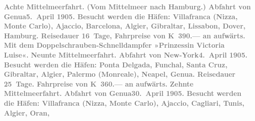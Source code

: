 \begin{ledgroupsized}[t]{13cm}
           \pstart
           \textcolor{gray}{\textbf{\textbf{Achte Mittelmeerfahrt.}
                  (Vom Mittelmeer nach Hamburg.) Abfahrt von Genua\textbf{5. April 1905}. Besucht werden die Häfen: Villafranca
                     (Nizza, Monte
                     Carlo), Ajaccio, Barcelona, Algier, Gibraltar, Lissabon, Dover, Hamburg. Reisedauer 16 Tage, Fahrpreise von \textbf{K 390.—} an aufwärts.}}\pend
           {\bigskip}\pstart
           \noindent{}\centering{}\textcolor{gray}{\textbf{Mit dem Doppelschrauben-Schnelldampfer »Prinzessin Victoria
                  Luise«.}}\pend
           \pstart
           \noindent{}\textcolor{gray}{\textbf{\textbf{Neunte Mittelmeerfahrt.}
                  Abfahrt von New-York\textbf{4. April 1905}. Besucht werden die Häfen: Ponta Delgada,
                     Funchal, Santa
                     Cruz, Gibraltar, Algier, Palermo (Monreale), Neapel, Genua. Reisedauer 25 Tage.
                  Fahrpreise von \textbf{K 360.—} an aufwärts.}}\pend
           \pstart
           \textcolor{gray}{\textbf{\textbf{Zehnte Mittelmeerfahrt.}
                  Abfahrt von Genua\textbf{30. April 1905}. Besucht werden die Häfen: Villafranca
                     (Nizza, Monte
                     Carlo), Ajaccio, Cagliari, Tunis, Algier, Oran,
}}
\end{ledgroupsized}
